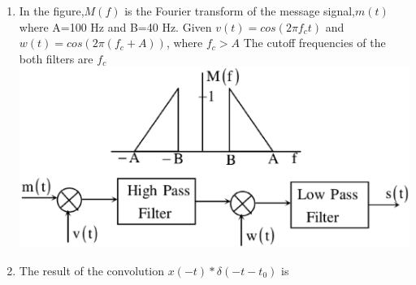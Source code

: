 \documentclass[journal,12pt,twocolumn]{IEEEtran}
\begin{document}
\begin{enumerate}
\begin{enumerate}[(A)]
\end{enumerate}

\item In the figure,$M(f)$ is the Fourier transform of the message signal,$m(t)$ where A=100 Hz and B=40 Hz. Given $v(t)=cos(2\pi f_c t)$ and $w(t)=cos(2\pi (f_c +A))$, where $f_c > A$ The cutoff frequencies of the both filters are \underline{\hspace{2cm}} $f_c$\\
\includegraphics[scale=0.3]{fig18.eps}


\item The result of the convolution $x(-t)*\delta(-t-t_0)$ is
\begin{enumerate}[(A)]

\end{enumerate}



\end{enumerate}
\end{document}
